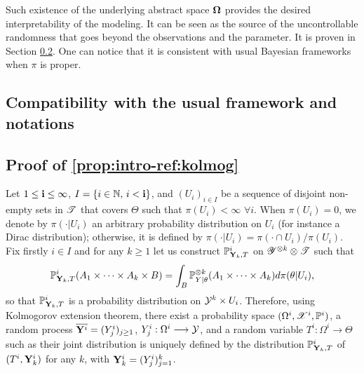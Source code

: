 Such existence of the underlying abstract space $\mathbf{\Omega}$ provides the desired interpretability of the modeling. It can be seen as the source of the uncontrollable randomness that goes beyond the observations and the parameter. It is proven in Section \ref{sec:intro-ref:proof}. One can notice that it is consistent with usual Bayesian frameworks when $\pi$ is proper.







\subsection{Compatibility with the usual framework and notations}\label{sec:intro-ref:frameworkcompatibility}



\subsection{Proof of \cref{prop:intro-ref:kolmog}}\label{sec:intro-ref:proof}



Let $1\leq\mathbf{i}\leq\infty$, $I=\{i\in\mathbb{N},\,i<\mathbf{i}\}$, and $(U_i)_{i\in I}$ be a sequence of disjoint non-empty sets in $\mathscr{T}$ that covers $\Theta$ such that $\pi(U_i)<\infty$ $\forall i$.
When $\pi(U_i)=0$, we denote by $\pi(\cdot|U_i)$ an arbitrary probability distribution on $U_i$ (for instance a Dirac distribution); otherwise, it is defined by $\pi(\cdot|U_i)=\pi(\cdot\cap U_i)/\pi(U_i)$.
    Fix firstly $i\in I$ and for any $k\geq1$ let us construct $\mathbb{P}_{\mathbf{Y}_k,T}^i$ on $\mathscr{Y}^{\otimes k}\otimes\mathscr{T}$ such that
        \begin{equation}
            \mathbb{P}_{\mathbf{Y}_k,T}^i(A_1\times\dots\times A_k\times B) = \int_B \mathbb{P}_{Y|\theta}^{\otimes k}(A_1\times\dots\times A_k)d\pi(\theta|U_i),
        \end{equation}
     so that $\mathbb{P}^i_{\mathbf{Y}_k,T}$ is a probability distribution on $\mathcal{Y}^k\times U_i$. 
    Therefore, using Kolmogorov extension theorem, there exist a probability space $(\Omega^i,\mathscr{X}^i,\mathbb{P}^i)$, a random process $\overline{\mathbf{Y}^i}=(Y^i_j)_{j\geq1}$, $Y_j^i:\Omega^i\longrightarrow\mathcal{Y}$, and a random variable $T^i:\Omega^i\to\Theta$ such as  their joint distribution is uniquely defined by the distribution
    $\mathbb{P}^i_{\mathbf{Y}_k,T}$ of $(T^i,\mathbf{Y}_k^i)$ for any $k$, with $\mathbf{Y}_k^i=(Y_j^i)_{j=1}^k$.



